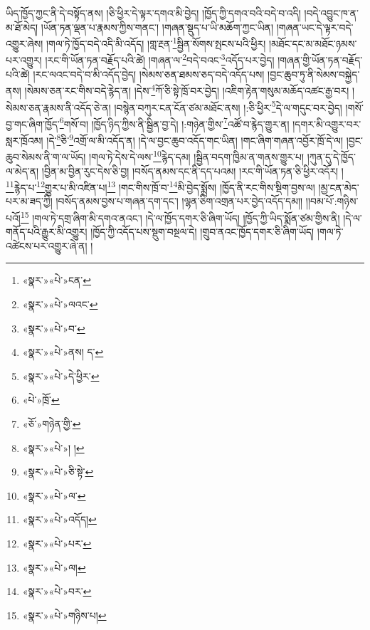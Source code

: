 ཡིད་ཁྱོད་ཀྱང་ནི་དེ་བསྟོད་ནས། །ཅི་ཕྱིར་དེ་ལྟར་དགའ་མི་བྱེད། །ཁྱོད་ཀྱི་དགའ་བའི་བདེ་བ་འདི། །བདེ་འབྱུང་ཁ་ན་མ་ཐོ་མེད། །ཡོན་ཏན་ལྡན་པ་རྣམས་ཀྱིས་གནང་། །གཞན་སྡུད་པ་ཡི་མཆོག་ཀྱང་ཡིན། །གཞན་ཡང་དེ་ལྟར་བདེ་འགྱུར་ཞེས། །གལ་ཏེ་ཁྱོད་བདེ་འདི་མི་འདོད། །གླ་རྔན་\footnote{«སྣར་»«པེ་»ངན་}སྦྱིན་སོགས་སྤངས་པའི་ཕྱིར། །མཐོང་དང་མ་མཐོང་ཉམས་པར་འགྱུར། །རང་གི་ཡོན་ཏན་བརྗོད་པའི་ཚེ། །གཞན་ལ་\footnote{«སྣར་»«པེ་»ལའང་}བདེ་བའང་\footnote{«སྣར་»«པེ་»བ་}འདོད་པར་བྱེད། །གཞན་གྱི་ཡོན་ཏན་བརྗོད་པའི་ཚེ། །རང་ལའང་བདེ་བ་མི་འདོད་བྱེད། །སེམས་ཅན་ཐམས་ཅད་བདེ་འདོད་པས། །བྱང་ཆུབ་ཏུ་ནི་སེམས་བསྐྱེད་ནས། །སེམས་ཅན་རང་གིས་བདེ་རྙེད་ན། །དེས་\footnote{«སྣར་»«པེ་»ནས། ད་}ཀོ་ཅི་སྟེ་ཁྲོ་བར་བྱེད། །འཇིག་རྟེན་གསུམ་མཆོད་འཚང་རྒྱ་བར། །སེམས་ཅན་རྣམས་ནི་འདོད་ཅེ་ན། །བསྙེན་བཀུར་ངན་ངོན་ཙམ་མཐོང་ནས། །:ཅི་ཕྱིར་\footnote{«སྣར་»«པེ་»དེ་ཕྱིར་}དེ་ལ་གདུང་བར་བྱེད། །གསོ་བྱ་གང་ཞིག་ཁྱོད་\footnote{«པེ་»ཁྲོ་}གསོ་བ། །ཁྱོད་ཉིད་ཀྱིས་ནི་སྦྱིན་བྱ་དེ། །:གཉེན་གྱིས་\footnote{«ཅོ་»གཉེན་གྱི་}འཚོ་བ་རྙེད་གྱུར་ན། །དགར་མི་འགྱུར་བར་སླར་ཁྲོའམ། །དེ་\footnote{«སྣར་»«པེ་»། །}ཅི་\footnote{«སྣར་»«པེ་»ཅི་སྟེ་}འགྲོ་ལ་མི་འདོད་ན། །དེ་ལ་བྱང་ཆུབ་འདོད་གང་ཡིན། །གང་ཞིག་གཞན་འབྱོར་ཁྲོ་དེ་ལ། །བྱང་ཆུབ་སེམས་ནི་ག་ལ་ཡོད། །གལ་ཏེ་དེས་དེ་ལས་\footnote{«སྣར་»«པེ་»ལ་}རྙེད་དམ། །སྦྱིན་བདག་ཁྱིམ་ན་གནས་གྱུར་པ། །ཀུན་དུ་དེ་ཁྱོད་ལ་མེད་ན། །བྱིན་མ་བྱིན་རུང་དེས་ཅི་བྱ། །བསོད་ནམས་དང་ནི་དད་པའམ། །རང་གི་ཡོན་ཏན་ཅི་ཕྱིར་འདོར། །\footnote{«སྣར་»«པེ་»འདོད། }རྙེད་པ་\footnote{«སྣར་»«པེ་»པར་}གྱུར་པ་མི་འཛིན་པ།\footnote{«སྣར་»«པེ་»ལ།} །གང་གིས་ཁྲོ་བ་\footnote{«སྣར་»«པེ་»བར་}མི་བྱེད་སྨྲོས། །ཁྱོད་ནི་རང་གིས་སྡིག་བྱས་ལ། །མྱ་ངན་མེད་པར་མ་ཟད་ཀྱི། །བསོད་ནམས་བྱས་པ་གཞན་དག་དང་། །ལྷན་ཅིག་འགྲན་པར་བྱེད་འདོད་དམ།། །།བམ་པོ་:གཉིས་པའོ།\footnote{«སྣར་»«པེ་»གཉིས་པ།} །གལ་ཏེ་དགྲ་ཞིག་མི་དགའ་ནའང་། །དེ་ལ་ཁྱོད་དགར་ཅི་ཞིག་ཡོད། །ཁྱོད་ཀྱི་ཡིད་སྨོན་ཙམ་གྱིས་ནི། །དེ་ལ་གནོད་པའི་རྒྱུར་མི་འགྱུར། །ཁྱོད་ཀྱི་འདོད་པས་སྡུག་བསྔལ་དེ། །གྲུབ་ནའང་ཁྱོད་དགར་ཅི་ཞིག་ཡོད། །གལ་ཏེ་འཚེངས་པར་འགྱུར་ཞེ་ན། །

